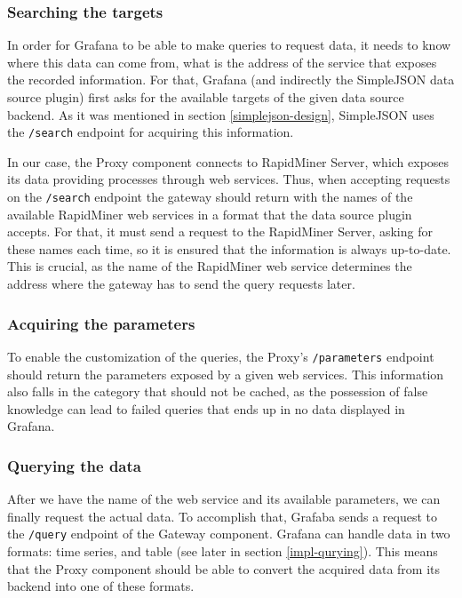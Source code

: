 \subsubsection{Searching the targets}

In order for Grafana to be able to make queries to request data, it needs to know where this data can come from, what is the address of the service that exposes the recorded information. For that, Grafana (and indirectly the SimpleJSON data source plugin) first asks for the available targets of the given data source backend. As it was mentioned in section \ref{simplejson-design}, SimpleJSON uses the \texttt{/search} endpoint for acquiring this information.

In our case, the Proxy component connects to RapidMiner Server, which exposes its data providing processes through web services. Thus, when accepting requests on the \texttt{/search} endpoint the gateway should return with the names of the available RapidMiner web services in a format that the data source plugin accepts. For that, it must send a request to the RapidMiner Server, asking for these names each time, so it is ensured that the information is always up-to-date. This is crucial, as the name of the RapidMiner web service determines the address where the gateway has to send the query requests later.

\subsubsection{Acquiring the parameters}

To enable the customization of the queries, the Proxy's \texttt{/parameters} endpoint should return the parameters exposed by a given web services. This information also falls in the category that should not be cached, as the possession of false knowledge can lead to failed queries that ends up in no data displayed in Grafana.

\subsubsection{Querying the data}
After we have the name of the web service and its available parameters, we can finally request the actual data. To accomplish that,  Grafaba sends a request to the \texttt{/query} endpoint of the Gateway component. Grafana can handle data in two formats: time series, and table (see later in section \ref{impl-qurying}). This means that the Proxy component should be able to convert the acquired data from its backend into one of these formats.

